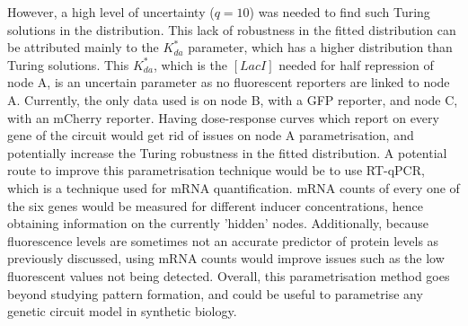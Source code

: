 However, a high level of uncertainty ($q=10$) was needed to find such Turing solutions in the distribution.
This lack of robustness in the fitted distribution can be attributed mainly to the $K^*_{da}$ parameter, which has a higher distribution than Turing solutions.
This $K^*_{da}$, which is the $[LacI]$ needed for half repression of node A, is an uncertain parameter as no fluorescent reporters are linked to node A.
Currently, the only data used is on node B, with a GFP reporter, and node
C, with an mCherry reporter.
Having dose-response curves which report on every gene of the circuit would get rid of issues on node A parametrisation, and potentially increase the Turing robustness in the fitted distribution.
A potential route to improve this parametrisation technique would be to use RT-qPCR, which is a technique used for mRNA quantification.
mRNA counts of every one of the six genes would be measured for different inducer concentrations, hence obtaining information on the currently 'hidden' nodes.
Additionally, because fluorescence levels are sometimes not an accurate predictor of protein levels as previously discussed, using mRNA counts would improve issues such as the low fluorescent values not being detected.
Overall, this parametrisation method goes beyond studying pattern formation, and could be useful to parametrise any genetic circuit model in synthetic biology.













